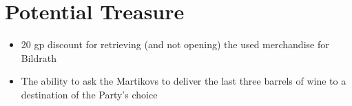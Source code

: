 \documentclass[a4paper,11pt]{article}
\begin{document}
\section{Potential Treasure}
\label{sec:PotentialTreasure}
\begin{itemize}
  \item 20 gp discount for retrieving (and not opening) the used merchandise for Bildrath
  \item The ability to ask the Martikovs to deliver the last three barrels of wine to a destination of the 
  Party's choice
\end{itemize}
\end{document}
